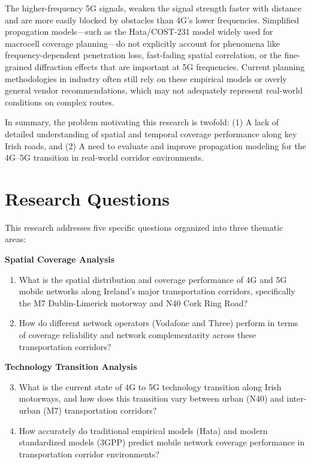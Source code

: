 \documentclass[MScCS]{uccthesis}
\begin{document}
The higher-frequency 5G signals, weaken the signal strength faster with distance and are more easily blocked by obstacles than 4G's lower frequencies. Simplified propagation models---such as the Hata/COST-231 model widely used for macrocell coverage planning---do not explicitly account for phenomena like frequency-dependent penetration loss, fast-fading spatial correlation, or the fine-grained diffraction effects that are important at 5G frequencies. Current planning methodologies in industry often still rely on these empirical models or overly general vendor recommendations, which may not adequately represent real-world conditions on complex routes.

In summary, the problem motivating this research is twofold: 
(1) A lack of detailed understanding of spatial and temporal coverage performance along key Irish roads, and 
(2) A need to evaluate and improve propagation modeling for the 4G--5G transition in real-world corridor environments.

\section{Research Questions}

This research addresses five specific questions organized into three thematic areas:

\textbf{Spatial Coverage Analysis}
\begin{enumerate}
\item What is the spatial distribution and coverage performance of 4G and 5G mobile networks along Ireland's major transportation corridors, specifically the M7 Dublin-Limerick motorway and N40 Cork Ring Road?

\item How do different network operators (Vodafone and Three) perform in terms of coverage reliability and network complementarity across these transportation corridors?
\end{enumerate}

\textbf{Technology Transition Analysis}
\begin{enumerate}
\setcounter{enumi}{2}
\item What is the current state of 4G to 5G technology transition along Irish motorways, and how does this transition vary between urban (N40) and inter-urban (M7) transportation corridors?

\item How accurately do traditional empirical models (Hata) and modern standardized models (3GPP) predict mobile network coverage performance in transportation corridor environments?
\end{enumerate}
\end{document}
